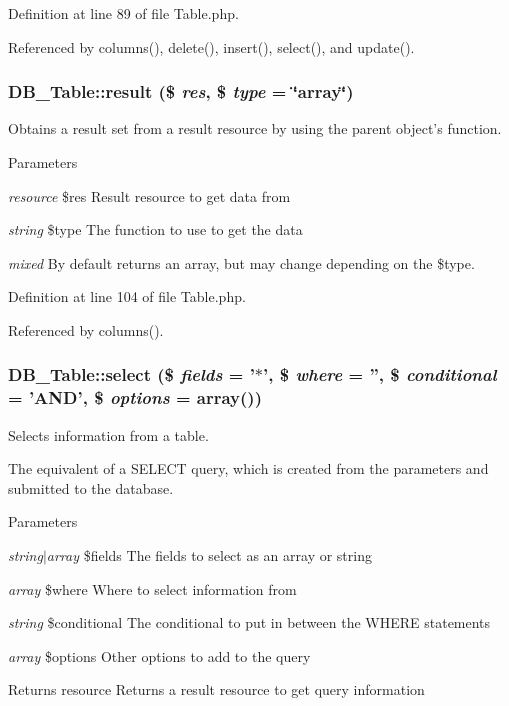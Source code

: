 Definition at line 89 of file Table.php.

Referenced by columns(), delete(), insert(), select(), and update().\hypertarget{classDB__Table_a041e54ac21aac399fb9ba2f6227554b1}{
\subsubsection[{result}]{\setlength{\rightskip}{0pt plus 5cm}DB\_\-Table::result (\$ {\em res}, \/  \$ {\em type} = {\ttfamily \char`\"{}array\char`\"{}})}}
\label{d6/d90/classDB__Table_a041e54ac21aac399fb9ba2f6227554b1}
Obtains a result set from a result resource by using the parent object's function.


\begin{DoxyParams}{Parameters}
\item[{\em resource}]\$res Result resource to get data from \item[{\em string}]\$type The function to use to get the data\item[{\em mixed}]By default returns an array, but may change depending on the \$type. \end{DoxyParams}


Definition at line 104 of file Table.php.

Referenced by columns().\hypertarget{classDB__Table_a9d3c4b24a4c0d7218dd6b4f376a1aa9b}{
\subsubsection[{select}]{\setlength{\rightskip}{0pt plus 5cm}DB\_\-Table::select (\$ {\em fields} = {\ttfamily '$\ast$'}, \/  \$ {\em where} = {\ttfamily ''}, \/  \$ {\em conditional} = {\ttfamily 'AND'}, \/  \$ {\em options} = {\ttfamily array()})}}
\label{d6/d90/classDB__Table_a9d3c4b24a4c0d7218dd6b4f376a1aa9b}
Selects information from a table.

The equivalent of a SELECT query, which is created from the parameters and submitted to the database.


\begin{DoxyParams}{Parameters}
\item[{\em string$|$array}]\$fields The fields to select as an array or string \item[{\em array}]\$where Where to select information from \item[{\em string}]\$conditional The conditional to put in between the WHERE statements \item[{\em array}]\$options Other options to add to the query\end{DoxyParams}
\begin{DoxyReturn}{Returns}
resource Returns a result resource to get query information 
\end{DoxyReturn}


